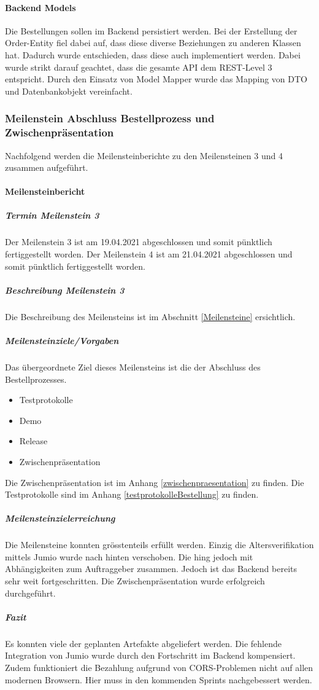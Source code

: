 \paragraph{Backend Models}
Die Bestellungen sollen im Backend persistiert werden. Bei der Erstellung der Order-Entity fiel dabei auf, dass diese diverse Beziehungen zu anderen Klassen hat. Dadurch wurde entschieden, dass diese auch implementiert werden. 
Dabei wurde strikt darauf geachtet, dass die gesamte API dem REST-Level 3 entspricht. Durch den Einsatz von Model Mapper wurde das Mapping von DTO und Datenbankobjekt vereinfacht. 


\subsubsection{Meilenstein Abschluss Bestellprozess und Zwischenpräsentation}
Nachfolgend werden die Meilensteinberichte zu den Meilensteinen 3 und 4 zusammen aufgeführt. 
 \paragraph{Meilensteinbericht}
 \subparagraph{Termin Meilenstein 3}
 Der Meilenstein 3 ist am 19.04.2021 abgeschlossen und somit pünktlich fertiggestellt worden.
 Der Meilenstein 4 ist am 21.04.2021 abgeschlossen und somit pünktlich fertiggestellt worden. 
 \subparagraph{Beschreibung Meilenstein 3}
 Die Beschreibung des Meilensteins ist im Abschnitt \ref{Meilensteine} ersichtlich. 
 \subparagraph{Meilensteinziele/Vorgaben}
Das übergeordnete Ziel dieses Meilensteins ist die der Abschluss des Bestellprozesses. 
 \begin{itemize}
 	\item Testprotokolle
 	\item Demo
 	\item Release 
 	\item Zwischenpräsentation
 \end{itemize}
Die Zwischenpräsentation ist im Anhang \ref{zwischenpraesentation} zu finden. 
Die Testprotokolle sind im Anhang \ref{testprotokolleBestellung} zu finden. 
 \subparagraph{Meilensteinzielerreichung}
Die Meilensteine konnten grösstenteils erfüllt werden. Einzig die Altersverifikation mittels Jumio wurde nach hinten verschoben. Die hing jedoch mit Abhängigkeiten zum Auftraggeber zusammen. Jedoch ist das Backend bereits sehr weit fortgeschritten.  
Die Zwischenpräsentation wurde erfolgreich durchgeführt. 
 \subparagraph{Fazit}
Es konnten viele der geplanten Artefakte abgeliefert werden. Die fehlende Integration von Jumio wurde durch den Fortschritt im Backend kompensiert. Zudem funktioniert die Bezahlung aufgrund von CORS-Problemen nicht auf allen modernen Browsern. Hier muss in den kommenden Sprints nachgebessert werden. 

